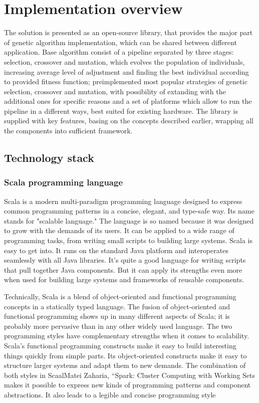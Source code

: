 \section{Implementation overview}

The solution is presented as an open-source library, that provides the major part of genetic algorithm implementation, which can be shared between different application. Base algorithm consist of a pipeline separated by three stages: selection, crossover and mutation, which evolves the population of individuals, increasing average level of adjustment and finding the best individual according to provided fitness function; preimplemented most popular strategies of genetic selection, crossover and mutation, with possibility of extanding with the additional ones for specific reasons and a set of platforms which allow to run the pipeline in a different ways, best suited for existing hardware. The library is supplied with key features, basing on the concepts described earlier, wrapping all the components into sufficient framework.

\subsection{Technology stack}

\subsubsection{Scala programming language}

Scala is a modern multi-paradigm programming language designed to express common programming patterns in a concise, elegant, and type-safe way. Its name stands for "scalable language." The language is so named because it was designed to grow with the demands of its users. It can be applied to a wide range of programming tasks, from writing small scripts to building large systems.
Scala is easy to get into. It runs on the standard Java platform and interoperates seamlessly with all Java libraries. It's quite a good language for writing scripts that pull together Java components. But it can apply its strengths even more when used for building large systems and frameworks of reusable components. \cite{programming_in_scala}

Technically, Scala is a blend of object-oriented and functional programming concepts in a statically typed language. The fusion of object-oriented and functional programming shows up in many different aspects of Scala; it is probably more pervasive than in any other widely used language. The two programming styles have complementary strengths when it comes to scalability. Scala's functional programming constructs make it easy to build interesting things quickly from simple parts. Its object-oriented constructs make it easy to structure larger systems and adapt them to new demands. The combination of both styles in ScaalMatei Zaharia, “Spark: Cluster Computing with Working Sets
 makes it possible to express new kinds of programming patterns and component abstractions. It also leads to a legible and concise programming style \cite{programming_in_scala}

